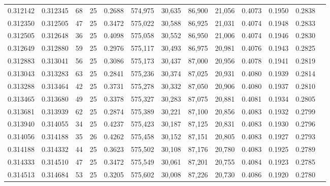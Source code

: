 \begin{tabular}{rrrrrrrrrrrrr}
0.312142 & 0.312345 &    68 &  25 &                                     0.2688 & 574,975 &  30,635 &  86,900 &  21,056 & 0.4073 & 0.1950 & 0.2838 \\
0.312350 & 0.312505 &    47 &  25 &                                     0.3472 & 575,022 &  30,588 &  86,925 &  21,031 & 0.4074 & 0.1948 & 0.2833 \\
0.312505 & 0.312648 &    36 &  25 &                                     0.4098 & 575,058 &  30,552 &  86,950 &  21,006 & 0.4074 & 0.1946 & 0.2830 \\
0.312649 & 0.312880 &    59 &  25 &                                     0.2976 & 575,117 &  30,493 &  86,975 &  20,981 & 0.4076 & 0.1943 & 0.2825 \\
0.312883 & 0.313041 &    56 &  25 &                                     0.3086 & 575,173 &  30,437 &  87,000 &  20,956 & 0.4078 & 0.1941 & 0.2819 \\
0.313043 & 0.313283 &    63 &  25 &                                     0.2841 & 575,236 &  30,374 &  87,025 &  20,931 & 0.4080 & 0.1939 & 0.2814 \\
0.313288 & 0.313464 &    42 &  25 &                                     0.3731 & 575,278 &  30,332 &  87,050 &  20,906 & 0.4080 & 0.1937 & 0.2810 \\
0.313465 & 0.313680 &    49 &  25 &                                     0.3378 & 575,327 &  30,283 &  87,075 &  20,881 & 0.4081 & 0.1934 & 0.2805 \\
0.313681 & 0.313939 &    62 &  25 &                                     0.2874 & 575,389 &  30,221 &  87,100 &  20,856 & 0.4083 & 0.1932 & 0.2799 \\
0.313940 & 0.314055 &    34 &  25 &                                     0.4237 & 575,423 &  30,187 &  87,125 &  20,831 & 0.4083 & 0.1930 & 0.2796 \\
0.314056 & 0.314188 &    35 &  26 &                                     0.4262 & 575,458 &  30,152 &  87,151 &  20,805 & 0.4083 & 0.1927 & 0.2793 \\
0.314188 & 0.314332 &    44 &  25 &                                     0.3623 & 575,502 &  30,108 &  87,176 &  20,780 & 0.4083 & 0.1925 & 0.2789 \\
0.314333 & 0.314510 &    47 &  25 &                                     0.3472 & 575,549 &  30,061 &  87,201 &  20,755 & 0.4084 & 0.1923 & 0.2785 \\
0.314513 & 0.314684 &    53 &  25 &                                     0.3205 & 575,602 &  30,008 &  87,226 &  20,730 & 0.4086 & 0.1920 & 0.2780 \\

\end{tabular}
